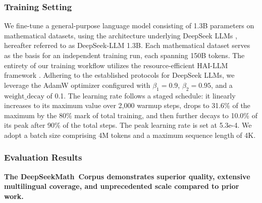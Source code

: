 \subsubsection{Training Setting}
\label{sec:quality-policy}
We fine-tune a general-purpose language model consisting of 1.3B parameters on mathematical datasets, using the architecture underlying DeepSeek LLMs \citep{deepseek-llm}, hereafter referred to as DeepSeek-LLM 1.3B. Each mathematical dataset serves as the basis for an independent training run, each spanning 150B tokens. The entirety of our training workflow utilizes the resource-efficient HAI-LLM framework \citep{haillm}. Adhering to the established protocols for DeepSeek LLMs, we leverage the AdamW optimizer \citep{adamW} configured with $\beta_1=0.9$, $\beta_2=0.95$, and a $\mathrm{weight\_decay}$ of 0.1. The learning rate follows a staged schedule: it linearly increases to its maximum value over 2,000 warmup steps, drops to 31.6\% of the maximum by the 80\% mark of total training, and then further decays to 10.0\% of its peak after 90\% of the total steps. The peak learning rate is set at 5.3e-4. We adopt a batch size comprising 4M tokens and a maximum sequence length of 4K.

\subsubsection{Evaluation Results}

\textbf{The DeepSeekMath~Corpus demonstrates superior quality, extensive multilingual coverage, and unprecedented scale compared to prior work.}

